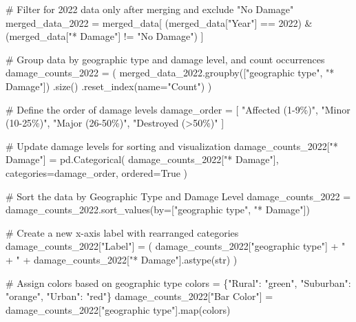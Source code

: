 \documentclass[
  letterpaper,
  DIV=11,
  numbers=noendperiod]{scrartcl}
\newenvironment{Shaded}{\begin{snugshade}}{\end{snugshade}}
\newcommand{\BuiltInTok}[1]{\textcolor[rgb]{0.00,0.23,0.31}{#1}}
\newcommand{\CommentTok}[1]{\textcolor[rgb]{0.37,0.37,0.37}{#1}}
\newcommand{\DecValTok}[1]{\textcolor[rgb]{0.68,0.00,0.00}{#1}}
\newcommand{\NormalTok}[1]{\textcolor[rgb]{0.00,0.23,0.31}{#1}}
\newcommand{\OperatorTok}[1]{\textcolor[rgb]{0.37,0.37,0.37}{#1}}
\newcommand{\StringTok}[1]{\textcolor[rgb]{0.13,0.47,0.30}{#1}}
\newcommand{\VariableTok}[1]{\textcolor[rgb]{0.07,0.07,0.07}{#1}}
\begin{document}
\begin{Shaded}
\begin{Highlighting}[]
\CommentTok{\# Filter for 2022 data only after merging and exclude "No Damage"}
\NormalTok{merged\_data\_2022 }\OperatorTok{=}\NormalTok{ merged\_data[}
\NormalTok{    (merged\_data[}\StringTok{"Year"}\NormalTok{] }\OperatorTok{==} \DecValTok{2022}\NormalTok{) }\OperatorTok{\&}
\NormalTok{    (merged\_data[}\StringTok{"* Damage"}\NormalTok{] }\OperatorTok{!=} \StringTok{"No Damage"}\NormalTok{)}
\NormalTok{]}

\CommentTok{\# Group data by geographic type and damage level, and count occurrences}
\NormalTok{damage\_counts\_2022 }\OperatorTok{=}\NormalTok{ (}
\NormalTok{    merged\_data\_2022.groupby([}\StringTok{"geographic type"}\NormalTok{, }\StringTok{"* Damage"}\NormalTok{])}
\NormalTok{    .size()}
\NormalTok{    .reset\_index(name}\OperatorTok{=}\StringTok{"Count"}\NormalTok{)}
\NormalTok{)}

\CommentTok{\# Define the order of damage levels}
\NormalTok{damage\_order }\OperatorTok{=}\NormalTok{ [}
    \StringTok{"Affected (1{-}9\%)"}\NormalTok{, }
    \StringTok{"Minor (10{-}25\%)"}\NormalTok{, }
    \StringTok{"Major (26{-}50\%)"}\NormalTok{, }
    \StringTok{"Destroyed (\textgreater{}50\%)"}
\NormalTok{]}

\CommentTok{\# Update damage levels for sorting and visualization}
\NormalTok{damage\_counts\_2022[}\StringTok{"* Damage"}\NormalTok{] }\OperatorTok{=}\NormalTok{ pd.Categorical(}
\NormalTok{    damage\_counts\_2022[}\StringTok{"* Damage"}\NormalTok{], categories}\OperatorTok{=}\NormalTok{damage\_order, ordered}\OperatorTok{=}\VariableTok{True}
\NormalTok{)}

\CommentTok{\# Sort the data by Geographic Type and Damage Level}
\NormalTok{damage\_counts\_2022 }\OperatorTok{=}\NormalTok{ damage\_counts\_2022.sort\_values(by}\OperatorTok{=}\NormalTok{[}\StringTok{"geographic type"}\NormalTok{, }\StringTok{"* Damage"}\NormalTok{])}

\CommentTok{\# Create a new x{-}axis label with rearranged categories}
\NormalTok{damage\_counts\_2022[}\StringTok{"Label"}\NormalTok{] }\OperatorTok{=}\NormalTok{ (}
\NormalTok{    damage\_counts\_2022[}\StringTok{"geographic type"}\NormalTok{] }\OperatorTok{+} \StringTok{" + "} \OperatorTok{+}\NormalTok{ damage\_counts\_2022[}\StringTok{"* Damage"}\NormalTok{].astype(}\BuiltInTok{str}\NormalTok{)}
\NormalTok{)}

\CommentTok{\# Assign colors based on geographic type}
\NormalTok{colors }\OperatorTok{=}\NormalTok{ \{}\StringTok{"Rural"}\NormalTok{: }\StringTok{"green"}\NormalTok{, }\StringTok{"Suburban"}\NormalTok{: }\StringTok{"orange"}\NormalTok{, }\StringTok{"Urban"}\NormalTok{: }\StringTok{"red"}\NormalTok{\}}
\NormalTok{damage\_counts\_2022[}\StringTok{"Bar Color"}\NormalTok{] }\OperatorTok{=}\NormalTok{ damage\_counts\_2022[}\StringTok{"geographic type"}\NormalTok{].}\BuiltInTok{map}\NormalTok{(colors)}


\end{Highlighting}
\end{Shaded}
\end{document}
